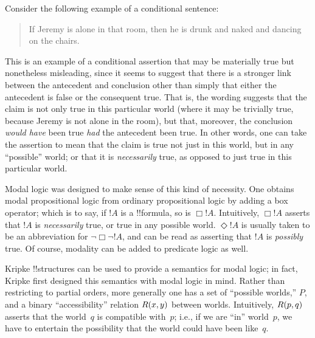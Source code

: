 \documentclass[../../include/open-logic-section]{subfiles}
\begin{document}


Consider the following example of a conditional sentence:
\begin{quote}
  If Jeremy is alone in that room, then he is drunk and naked and
  dancing on the chairs.
\end{quote}
This is an example of a conditional assertion that may be materially
true but nonetheless misleading, since it seems to suggest that there
is a stronger link between the antecedent and conclusion other than
simply that either the antecedent is false or the consequent
true. That is, the wording suggests that the claim is not only true in
this particular world (where it may be trivially true, because Jeremy
is not alone in the room), but that, moreover, the conclusion
\emph{would have} been true \emph{had} the antecedent been true. In
other words, one can take the assertion to mean that the claim is true
not just in this world, but in any ``possible'' world; or that it is
\emph{necessarily} true, as opposed to just true in this particular
world.

Modal logic was designed to make sense of this kind of necessity. One
obtains modal propositional logic from ordinary
propositional logic by adding a box operator; which is to say, if
$!A$ is a !!{formula}, so is $\Box !A$.  Intuitively, $\Box !A$
asserts that $!A$ is \emph{necessarily} true, or true in any possible
world. $\Diamond !A$ is usually taken to be an abbreviation for
$\lnot \Box \lnot !A$, and can be read as asserting that $!A$ is
\emph{possibly} true. Of course, modality can be added to predicate
logic as well.

Kripke !!{structure}s can be used to provide a semantics for modal
logic; in fact, Kripke first designed this semantics with modal logic
in mind. Rather than restricting to partial orders, more generally one
has a set of ``possible worlds,'' $P$, and a binary ``accessibility''
relation $\mathord{R}(x,y)$ between worlds. Intuitively, $\mathord{R}(p,q)$
asserts that the world~$q$ is compatible with~$p$; i.e., if we are
``in'' world~$p$, we have to entertain the possibility that the
world could have been like~$q$.
\end{document}
